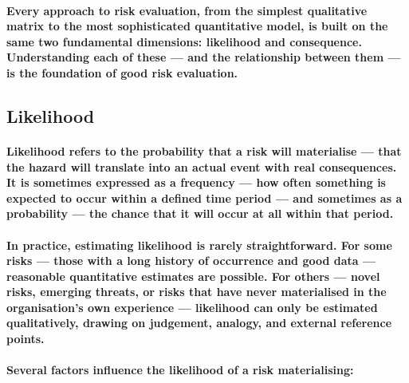 \paragraph{Every approach to risk evaluation, from the simplest qualitative matrix to the most sophisticated quantitative model, is built on the same two fundamental dimensions: likelihood and consequence. Understanding each of these — and the relationship between them — is the foundation of good risk evaluation.}

\subsection{Likelihood}
\paragraph{\textbf{Likelihood} refers to the probability that a risk will materialise — that the hazard will translate into an actual event with real consequences. It is sometimes expressed as a frequency — how often something is expected to occur within a defined time period — and sometimes as a probability — the chance that it will occur at all within that period.}
\paragraph{In practice, estimating likelihood is rarely straightforward. For some risks — those with a long history of occurrence and good data — reasonable quantitative estimates are possible. For others — novel risks, emerging threats, or risks that have never materialised in the organisation's own experience — likelihood can only be estimated qualitatively, drawing on judgement, analogy, and external reference points.}
\paragraph{Several factors influence the likelihood of a risk materialising:}
\begin{itemize}
\end{itemize}

